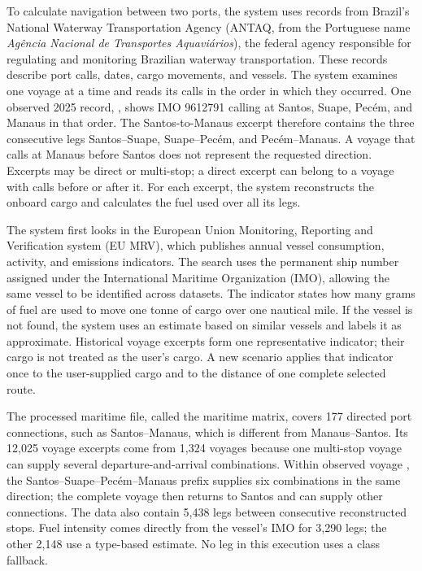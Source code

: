 \documentclass[12pt,a4paper,oneside]{report}
\newcommand{\codecell}[1]{\texttt{\seqsplit{#1}}}
\begin{document}
To calculate navigation between two ports, the system uses records from Brazil's National Waterway Transportation Agency (ANTAQ, from the Portuguese name \textit{Agência Nacional de Transportes Aquaviários}), the federal agency responsible for regulating and monitoring Brazilian waterway transportation. These records describe port calls, dates, cargo movements, and vessels. The system examines one voyage at a time and reads its calls in the order in which they occurred. One observed 2025 record, \codecell{voyage\_9612791\_00011}, shows IMO 9612791 calling at Santos, Suape, Pecém, and Manaus in that order. The Santos-to-Manaus excerpt therefore contains the three consecutive legs Santos--Suape, Suape--Pecém, and Pecém--Manaus. A voyage that calls at Manaus before Santos does not represent the requested direction. Excerpts may be direct or multi-stop; a direct excerpt can belong to a voyage with calls before or after it. For each excerpt, the system reconstructs the onboard cargo and calculates the fuel used over all its legs.

The system first looks in the European Union Monitoring, Reporting and Verification system (EU MRV), which publishes annual vessel consumption, activity, and emissions indicators. The search uses the permanent ship number assigned under the International Maritime Organization (IMO), allowing the same vessel to be identified across datasets. The indicator states how many grams of fuel are used to move one tonne of cargo over one nautical mile. If the vessel is not found, the system uses an estimate based on similar vessels and labels it as approximate. Historical voyage excerpts form one representative indicator; their cargo is not treated as the user's cargo. A new scenario applies that indicator once to the user-supplied cargo and to the distance of one complete selected route.

The processed maritime file, called the maritime matrix, covers 177 directed port connections, such as Santos--Manaus, which is different from Manaus--Santos. Its 12,025 voyage excerpts come from 1,324 voyages because one multi-stop voyage can supply several departure-and-arrival combinations. Within observed voyage \codecell{voyage\_9612791\_00011}, the Santos--Suape--Pecém--Manaus prefix supplies six combinations in the same direction; the complete voyage then returns to Santos and can supply other connections. The data also contain 5,438 legs between consecutive reconstructed stops. Fuel intensity comes directly from the vessel's IMO for 3,290 legs; the other 2,148 use a type-based estimate. No leg in this execution uses a class fallback.
\end{document}
